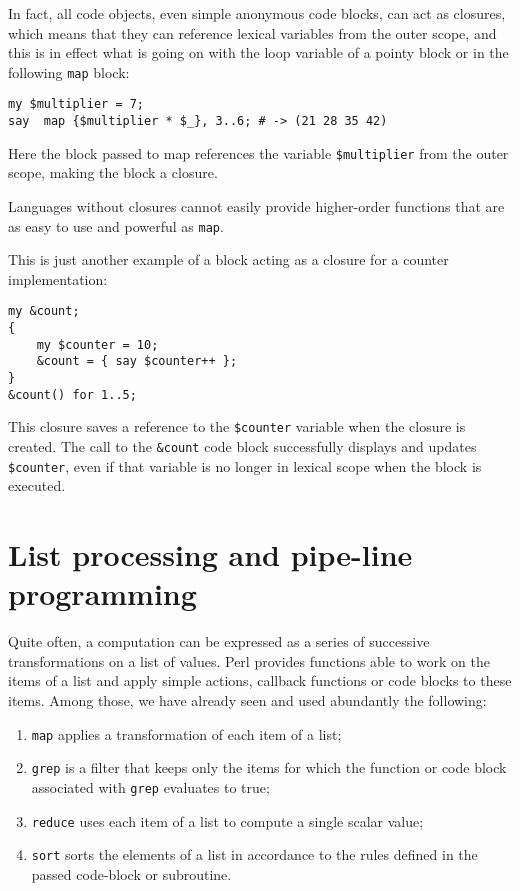 In fact, all code objects, even simple anonymous code 
blocks, can act as closures, which means that they can 
reference lexical variables from the outer scope, and this 
is in effect what is going on with the loop variable of 
a pointy block or in the following {\tt map} block:

\begin{verbatim}
my $multiplier = 7;
say  map {$multiplier * $_}, 3..6; # -> (21 28 35 42)
\end{verbatim}

Here the block passed to map references the variable 
\verb'$multiplier' from the outer scope, making the 
block a closure.

Languages without closures cannot easily provide 
higher-order functions that are as easy to use and 
powerful as {\tt map}.

This is just another example of a block acting as a 
closure for a counter implementation:

\begin{verbatim}
my &count;
{
    my $counter = 10;
    &count = { say $counter++ };
}
&count() for 1..5;  
\end{verbatim}

This closure saves a reference to the \verb'$counter' 
variable when the closure is created. The call to the 
\verb'&count' code block successfully displays and 
updates \verb'$counter', even if that variable is no
longer in lexical scope when the block is executed.

\section{List processing and pipe-line programming}

Quite often, a computation can be expressed as a 
series of successive transformations on a list of 
values. Perl provides functions able to work on 
the items of a list and apply simple actions, 
callback functions or code blocks to these items. 
Among those, we have already seen and used abundantly 
the following:
\begin{enumerate}
\item {\tt map} applies a transformation of each item 
of a list;
 
\item {\tt grep} is a filter that keeps only the items 
for which the function or code block associated with 
{\tt grep} evaluates to true;
 
\item {\tt reduce} uses each item of a list to compute 
a single scalar value;
 
\item {\tt sort} sorts the elements of a list in accordance 
to the rules defined in the passed code-block or 
subroutine. 
 
\end{enumerate}

